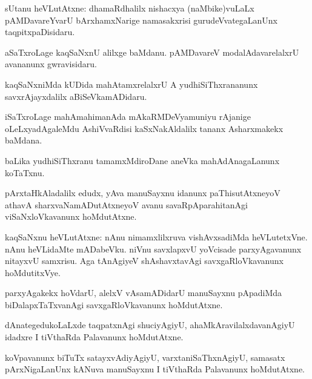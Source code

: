 \documentclass{article}
\begin{document}

\begin{mn}
sUtanu heVLutAtxne: dhamaRdhalilx nishacxya (naMbike)vuLaLx pAMDavareYvarU bArxhamxNarige 
namasakxrisi gurudeVvategaLanUnx taqpitxpaDisidaru.
\end{mn}

\begin{mn}
aSaTxroLage kaqSaNxnU alilxge baMdanu. pAMDavareV modalAdavarelalxrU avananunx gwravisidaru.
\end{mn}

\begin{mn}
kaqSaNxniMda kUDida mahAtamxrelalxrU A yudhiSiThxrananunx savxrAjayxdalilx aBiSeVkamADidaru.
\end{mn}

\begin{mn}
iSaTxroLage mahAmahimanAda mAkaRMDeVyamuniyu rAjanige oLeLxyadAgaleMdu AshiVvaRdisi 
kaSxNakAldalilx tananx Asharxmakekx baMdana.
\end{mn}

\begin{mn}
baLika yudhiSiThxranu tamamxMdiroDane aneVka mahAdAnagaLanunx koTaTxnu.
\end{mn}

\begin{mn}
pArxtaHkAladalilx edudx, yAva manuSayxnu idanunx paThisutAtxneyoV athavA sharxvaNamADutAtxneyoV 
avanu savaRpAparahitanAgi viSaNxloVkavanunx hoMdutAtxne.
\end{mn}

\begin{mn}
kaqSaNxnu heVLutAtxne: nAnu nimamxlilxruva vishAvxsadiMda heVLutetxVne. nAnu heVLidaMte 
mADabeVku. niVnu savxlapxvU yoVcisade parxyAgavanunx nitayxvU samxrisu. Aga tAnAgiyeV 
shAshavxtavAgi savxgaRloVkavanunx hoMdutitxVye.
\end{mn}

\begin{mn}
parxyAgakekx hoVdarU, alelxV vAsamADidarU manuSayxnu pApadiMda biDalapxTaTxvanAgi 
savxgaRloVkavanunx hoMdutAtxne.
\end{mn}

\begin{mn}
dAnategedukoLaLxde taqpatxnAgi shuciyAgiyU, ahaMkAravilalxdavanAgiyU idadxre I tiVthaRda 
Palavanunx hoMdutAtxne.
\end{mn}

\begin{mn}
koVpavanunx biTuTx satayxvAdiyAgiyU, varxtaniSaThxnAgiyU, samasatx pArxNigaLanUnx kANuva 
manuSayxnu I tiVthaRda Palavanunx hoMdutAtxne.
\end{mn}
\end{document}
